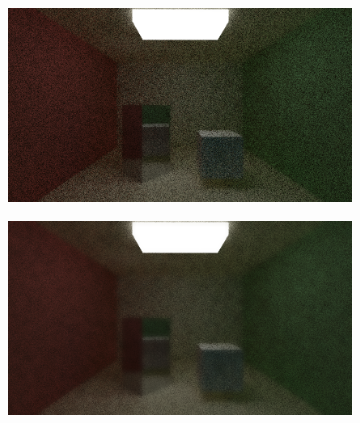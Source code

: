 \documentclass[titlepage,12pt]{report}
\begin{document}
\begin{figure}[H]
	\centering
	\begin{subfigure}{.48\textwidth}
		\centering
		\includegraphics[scale=0.2]{media/bilateral/cornell_normal_10_bilateral_filter_21_15_10.png}
		\label{bilateral_filter_9}
	\end{subfigure}
	\begin{subfigure}{.48\textwidth}
		\centering
		\includegraphics[scale=0.2]{media/bilateral/cornell_normal_10_bilateral_filter_21_15_20.png}
		\label{bilateral_filter_10}
	\end{subfigure}


\end{figure}
\end{document}
